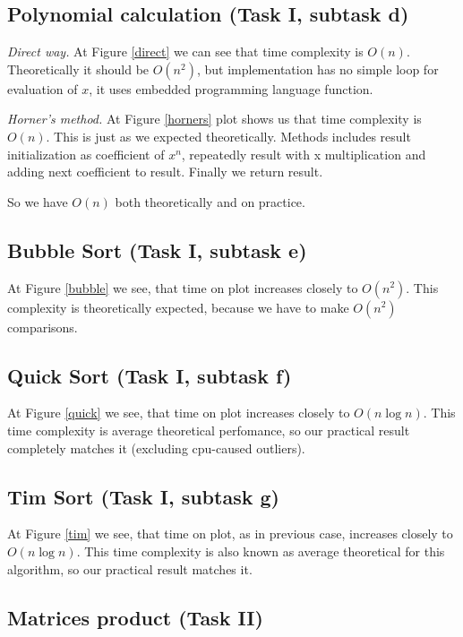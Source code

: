 \documentclass[a4paper,article,14pt]{extarticle}
\begin{document}
	\subsection{Polynomial calculation (Task I, subtask d)}
	
	\textit{Direct way.} At Figure \ref{direct} we can see that time complexity is $O(n)$. Theoretically it should be $O(n^2)$, but implementation has no simple loop for evaluation of $x$, it uses embedded programming language function.
	
	
	\textit{Horner's method.} At Figure \ref{horners} plot shows us that time complexity is $O(n)$. This is just as we expected theoretically. Methods includes result initialization as coefficient of $x^n$, repeatedly result with x multiplication and adding next coefficient to result. Finally we return result. 
	
	So we have $O(n)$ both theoretically and on practice. 
	
	\subsection{Bubble Sort (Task I, subtask e)}
	
	At Figure \ref{bubble} we see, that time on plot increases closely to $O(n^2)$. This complexity is theoretically expected, because we have to make $O(n^2)$ comparisons.
	
	\subsection{Quick Sort (Task I, subtask f)}
	
	At Figure \ref{quick} we see, that time on plot increases closely to $O(n\log n)$. This time complexity is average theoretical perfomance, so our practical result completely matches it (excluding cpu-caused outliers).
	
	\subsection{Tim Sort (Task I, subtask g)}
	
	At Figure \ref{tim} we see, that time on plot, as in previous case, increases closely to $O(n\log n)$. This time complexity is also known as average theoretical for this algorithm, so our practical result matches it.
	
	\subsection{Matrices product (Task II)}
	
\end{document}
